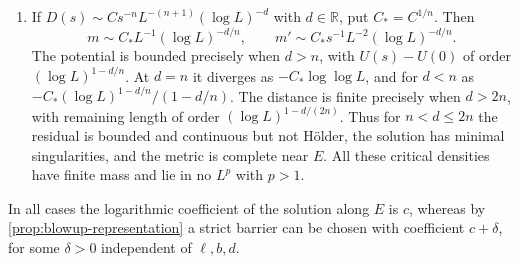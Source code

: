 \begin{theorem}
\begin{enumerate}
\item If $D(s)\sim Cs^{-n}L^{-(n+1)}(\log L)^{-d}$ with $d\in\mathbb R$, put $C_*=C^{1/n}$. Then
\begin{equation}\label{eq:iterated-log-asymptotics}
 m\sim C_*L^{-1}(\log L)^{-d/n},\qquad
 m'\sim C_*s^{-1}L^{-2}(\log L)^{-d/n}.
\end{equation}
The potential is bounded precisely when $d>n$, with $U(s)-U(0)$ of order $(\log L)^{1-d/n}$. At $d=n$ it diverges as $-C_*\log\log L$, and for $d<n$ as $-C_*(\log L)^{1-d/n}/(1-d/n)$. The distance is finite precisely when $d>2n$, with remaining length of order $(\log L)^{1-d/(2n)}$. Thus for $n<d\leq2n$ the residual is bounded and continuous but not H\"older, the solution has minimal singularities, and the metric is complete near $E$. All these critical densities have finite mass and lie in no $L^p$ with $p>1$.
\end{enumerate}
In all cases the logarithmic coefficient of the solution along $E$ is $c$, whereas by \cref{prop:blowup-representation} a strict barrier can be chosen with coefficient $c+\delta$, for some $\delta>0$ independent of $\ell,b,d$.
\end{theorem}


